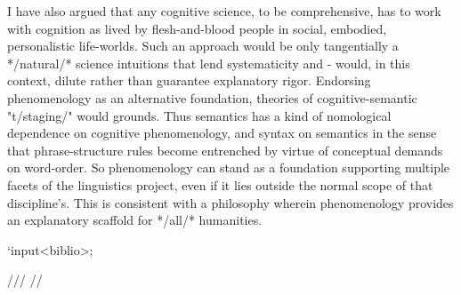 I have also argued that any cognitive 
science, to be comprehensive, has to work 
with cognition as lived by flesh-and-blood 
people in social, embodied, personalistic life-worlds.  
Such an approach would be only tangentially a 
*/natural/* science %
intuitions that lend systematicity 
and -%
would, in this context, dilute rather than 
guarantee explanatory rigor.  Endorsing  
phenomenology as an alternative foundation, 
theories of cognitive-semantic "t/staging/" 
would %
grounds.  Thus semantics has a 
kind of nomological dependence 
on cognitive phenomenology, and 
syntax on semantics in the sense 
that phrase-structure rules become entrenched 
by virtue of conceptual demands on word-order.  
So phenomenology can stand as a foundation 
supporting multiple facets of the 
linguistics project, even if it 
lies outside the normal scope of that 
discipline's.  This is consistent with a 
philosophy wherein  
phenomenology provides an explanatory 
scaffold for */all/* humanities.

`input<biblio>;


/// //


